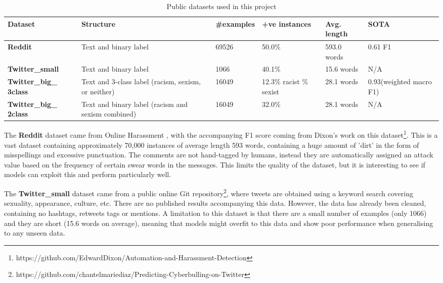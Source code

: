 \documentclass[12pt,a4paper]{article}
\begin{document}
\begin{table}[htb]
	\centering
	\caption{Public datasets used in this project}
	\label{data}
	\hspace*{-2.2cm}
	\begin{tabular}{p{3.4cm} p{5.2cm} p{2cm} p{2.5cm} p{2.2cm} p{2.2cm}} \hline\hline
		\textbf{Dataset} & \textbf{Structure} & \textbf{\#examples} & \textbf{+ve instances} & \textbf{Avg. length} & \textbf{SOTA} \\ \hline
		\textbf{Reddit} & Text and binary label & 69526 & 50.0\% & 593.0 words & 0.61 F1\\ \hline
		\textbf{Twitter\_small} & Text and binary label & 1066 & 40.1\% & 15.6 words & N/A \\ \hline
		\textbf{Twitter\_big\_ 3class} & Text and 3-class label \newline (racism, sexism, or neither) & 16049 & 12.3\% racist \newline 19.7\% sexist & 28.1 words & 0.93\newline (weighted macro F1) \\ \hline
		\textbf{Twitter\_big\_ 2class} & Text and binary label \newline (racism and sexism combined) & 16049 & 32.0\% & 28.1 words & N/A \\ \hline
	\end{tabular}
\end{table}

The \textbf{Reddit} dataset came from Online Harassment \cite{Golbeck}, with the accompanying F1 score coming from Dixon's work \citeyear{Dixon} on this dataset\footnote{https://github.com/EdwardDixon/Automation-and-Harassment-Detection}. This is a vast dataset containing approximately 70,000 instances of average length 593 words, containing a huge amount of 'dirt' in the form of misspellings and excessive punctuation. The comments are not hand-tagged by humans, instead they are automatically assigned an attack value based on the frequency of certain swear words in the messages. This limits the quality of the dataset, but it is interesting to see if models can exploit this and perform particularly well.

The \textbf{Twitter\_small} dataset came from a public online Git repository\footnote{https://github.com/chantelmariediaz/Predicting-Cyberbulling-on-Twitter}, where tweets are obtained using a keyword search covering sexuality, appearance, culture, etc. There are no published results accompanying this data. However, the data has already been cleaned, containing no hashtags, retweets tags or mentions. A limitation to this dataset is that there are a small number of examples (only 1066) and they are short (15.6 words on average), meaning that models might overfit to this data and show poor performance when generalising to any unseen data.
\end{document}
